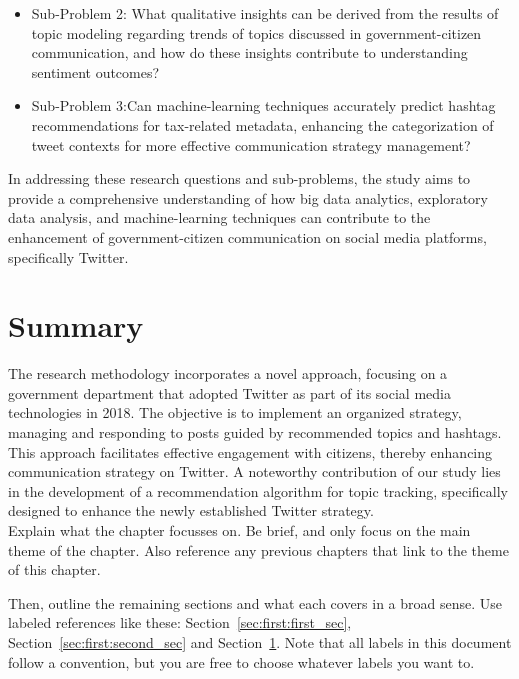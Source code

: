 \begin{itemize}
    \item Sub-Problem 2:  What qualitative insights can be derived from the results of topic modeling regarding trends of topics discussed in government-citizen communication, and how do these insights contribute to understanding sentiment outcomes?
    \end{itemize}

\begin{itemize}
    \item Sub-Problem 3:Can machine-learning techniques accurately predict hashtag recommendations for tax-related metadata, enhancing the categorization of tweet contexts for more effective communication strategy management?
\end{itemize}

In addressing these research questions and sub-problems, the study aims to provide a comprehensive understanding of how big data analytics, exploratory data analysis, and machine-learning techniques can contribute to the enhancement of government-citizen communication on social media platforms, specifically Twitter.

\section{Summary}
\label{sec:first:summary}

The research methodology incorporates a novel approach, focusing on a government department that adopted Twitter as part of its social media technologies in 2018. The objective is to implement an organized strategy, managing and responding to posts guided by recommended topics and hashtags. This approach facilitates effective engagement with citizens, thereby enhancing communication strategy on Twitter. A noteworthy contribution of our study lies in the development of a recommendation algorithm for topic tracking, specifically designed to enhance the newly established Twitter strategy.\\




Explain what the chapter focusses on. Be brief, and only focus on the main theme of the chapter. Also reference any previous chapters that link to the theme of this chapter.

Then, outline the remaining sections and what each covers in a broad sense. Use labeled references like these: Section~\ref{sec:first:first_sec}, Section~\ref{sec:first:second_sec} and Section~\ref{sec:first:summary}. Note that all labels in this document follow a convention, but you are free to choose whatever labels you want to.

